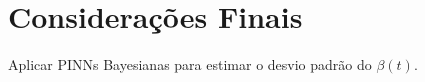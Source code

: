 \chapter{Considerações Finais}
\label{sec-conclusoes}

Aplicar PINNs Bayesianas \cite{yang:21-bpinns} para estimar o desvio 
padrão do $\beta(t)$.
